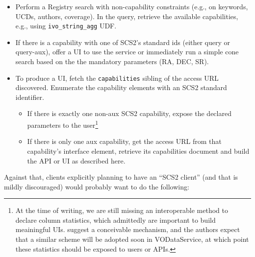 \documentclass[11pt,a4paper]{ivoa}
\begin{document}
\begin{itemize}
\item Perform a Registry search with non-capability constraints (e.g.,
on keywords, UCDs, authors, coverage).  In the query, retrieve the available
capabilities, e.g., using \verb|ivo_string_agg| UDF.

\item If there is a capability with one of SCS2's standard ids (either
query or query-aux), offer a UI to use the service or immediately run a
simple cone search based on the the mandatory parameters (RA, DEC, SR).

\item To produce a UI, fetch the \texttt{capabilities} sibling of the
access URL discovered.  Enumerate the capability elements with an SCS2
standard identifier.

\begin{itemize}
\item If there is exactly one non-aux SCS2 capability, expose
the declared parameters to the user\footnote{At the time of writing, we
are still missing an interoperable method to declare column statistics,
which admittedly are important to build meainingful UIs.
\citet{note:colstatnote} suggest a conceivable mechanism, and the
authors expect that a similar scheme will be adopted soon in
VODataService, at which point these statistics should be exposed to
users or APIs.}

\item If there is only one aux capability, get the access URL from that
capability's interface element, retrieve its capabilities document and
build the API or UI as described here.
\end{itemize}
\end{itemize}

Against that, clients explicitly planning to have an ``SCS2 client''
(and that is mildly discouraged) would probably want to do the
following:
\end{document}
